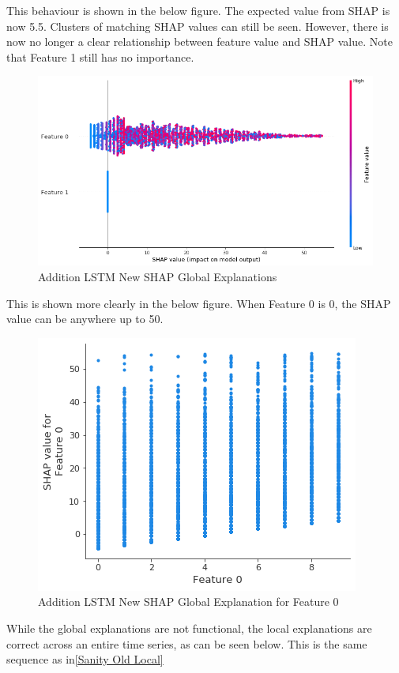\documentclass[12pt]{article}
\begin{document}
This behaviour is shown in the below figure. The expected value from SHAP is now 5.5. Clusters of matching SHAP values can still be seen. However, there is now no longer a clear relationship between feature value and SHAP value. Note that Feature 1 still has no importance. 

\begin{figure}[H]
\centering\caption{Addition LSTM New SHAP Global Explanations}
\includegraphics[scale=0.5]{Sanity New Global.png}
\end{figure}
This is shown more clearly in the below figure. When Feature 0 is 0, the SHAP value can be anywhere up to 50. 

\begin{figure}[H]
\centering\caption{Addition LSTM New SHAP Global Explanation for Feature 0}
\includegraphics[scale=0.7]{Sanity New Global Feature.png}
\end{figure}
While the global explanations are not functional, the local explanations are correct across an entire time series, as can be seen below. This is the same sequence as in\ref{Sanity Old Local}
\end{document}
